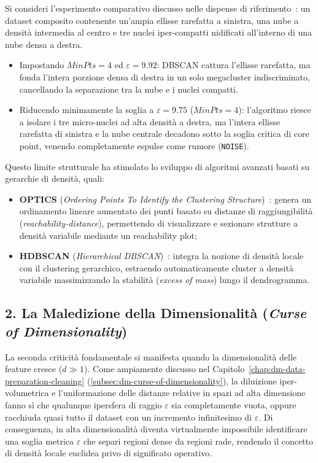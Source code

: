 Si consideri l'esperimento comparativo discusso nelle dispense di riferimento~\cite{tan2018}: un dataset composito contenente un'ampia ellisse rarefatta a sinistra, una nube a densità intermedia al centro e tre nuclei iper-compatti nidificati all'interno di una nube densa a destra.
\begin{itemize}
    \item Impostando $MinPts = 4$ ed $\varepsilon = 9.92$: DBSCAN cattura l'ellisse rarefatta, ma fonda l'intera porzione densa di destra in un solo megacluster indiscriminato, cancellando la separazione tra la nube e i nuclei compatti.
    \item Riducendo minimamente la soglia a $\varepsilon = 9.75$ ($MinPts = 4$): l'algoritmo riesce a isolare i tre micro-nuclei ad alta densità a destra, ma l'intera ellisse rarefatta di sinistra e la nube centrale decadono sotto la soglia critica di core point, venendo completamente espulse come rumore (\texttt{NOISE}).
\end{itemize}

Questo limite strutturale ha stimolato lo sviluppo di algoritmi avanzati basati su gerarchie di densità, quali:
\begin{itemize}
    \item \textbf{OPTICS} (\textit{Ordering Points To Identify the Clustering Structure})~\cite{ankerst1999}: genera un ordinamento lineare aumentato dei punti basato su distanze di raggiungibilità (\textit{reachability-distance}), permettendo di visualizzare e sezionare strutture a densità variabile mediante un reachability plot;
    \item \textbf{HDBSCAN} (\textit{Hierarchical DBSCAN})~\cite{campello2015}: integra la nozione di densità locale con il clustering gerarchico, estraendo automaticamente cluster a densità variabile massimizzando la stabilità (\textit{excess of mass}) lungo il dendrogramma.
\end{itemize}

\subsection{2. La Maledizione della Dimensionalità (\textit{Curse of Dimensionality})}

La seconda criticità fondamentale si manifesta quando la dimensionalità delle feature cresce ($d \gg 1$). Come ampiamente discusso nel Capitolo~\ref{chap:dm-data-preparation-cleaning} (\autoref{subsec:dm-curse-of-dimensionality}), la diluizione iper-volumetrica e l'uniformazione delle distanze relative in spazi ad alta dimensione fanno sì che qualunque ipersfera di raggio $\varepsilon$ sia completamente vuota, oppure racchiuda quasi tutto il dataset con un incremento infinitesimo di $\varepsilon$. Di conseguenza, in alta dimensionalità diventa virtualmente impossibile identificare una soglia metrica $\varepsilon$ che separi regioni dense da regioni rade, rendendo il concetto di densità locale euclidea privo di significato operativo.

